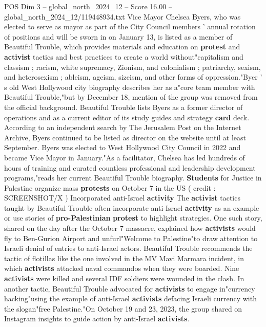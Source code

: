 \begin{textsample}{POS Dim 3 – global\_north\_2024\_12 – Score 16.00 – global\_north\_2024\_12/119448934.txt}  \label{ex:f3_pos_234}
Vice Mayor Chelsea Byers, who was elected to serve as mayor as part of the City Council members ' annual rotation of positions and will be sworn in on January 13, is listed as a member of Beautiful Trouble, which provides materials and education on \textbf{protest} and \textbf{activist} tactics and best practices to create a world without"capitalism and classism ; racism, white supremacy, Zionism, and colonialism ; patriarchy, sexism, and heterosexism ; ableism, ageism, sizeism, and other forms of oppression."Byer ' s old West Hollywood city biography describes her as a"core team member with Beautiful Trouble,"but by December 18, mention of the group was removed from the official background.
Beautiful Trouble lists Byers as a former director of operations and as a current editor of its study guides and strategy \textbf{card} deck.
According to an independent search by The Jerusalem Post on the Internet Archive, Byers continued to be listed as director on the website until at least September.
Byers was elected to West Hollywood City Council in 2022 and became Vice Mayor in January."As a facilitator, Chelsea has led hundreds of hours of training and curated countless professional and leadership development programs,"reads her current Beautiful Trouble biography. \textbf{Students} for Justice in Palestine organize mass \textbf{protests} on October 7 in the US ( credit : SCREENSHOT/X ) Incorporated anti-Israel \textbf{activity} The \textbf{activist} tactics taught by Beautiful Trouble often incorporate anti-Israel \textbf{activity} as an example or use stories of \textbf{pro-Palestinian} \textbf{protest} to highlight strategies.
One such story, shared on the day after the October 7 massacre, explained how \textbf{activists} would fly to Ben-Gurion Airport and unfurl"Welcome to Palestine"to draw attention to Israeli denial of entries to anti-Israel actors.
Beautiful Trouble recommends the tactic of flotillas like the one involved in the MV Mavi Marmara incident, in which \textbf{activists} attacked naval commandos when they were boarded.
Nine \textbf{activists} were killed and several IDF soldiers were wounded in the clash.
In another tactic, Beautiful Trouble advocated for \textbf{activists} to engage in"currency hacking"using the example of anti-Israel \textbf{activists} defacing Israeli currency with the slogan"free Palestine."On October 19 and 23, 2023, the group shared on Instagram insights to guide action by anti-Israel \textbf{activists}.

\end{textsample}
